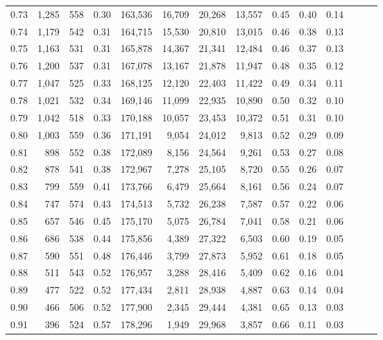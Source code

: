 \begin{tabular}{rrrrrrrrrrrrrr}
0.73 &  1,285 &  558 &  0.30 &  163,536 &   16,709 &  20,268 &  13,557 &  0.45 &  0.40 &      0.14 \\
0.74 &  1,179 &  542 &  0.31 &  164,715 &   15,530 &  20,810 &  13,015 &  0.46 &  0.38 &      0.13 \\
0.75 &  1,163 &  531 &  0.31 &  165,878 &   14,367 &  21,341 &  12,484 &  0.46 &  0.37 &      0.13 \\
0.76 &  1,200 &  537 &  0.31 &  167,078 &   13,167 &  21,878 &  11,947 &  0.48 &  0.35 &      0.12 \\
0.77 &  1,047 &  525 &  0.33 &  168,125 &   12,120 &  22,403 &  11,422 &  0.49 &  0.34 &      0.11 \\
0.78 &  1,021 &  532 &  0.34 &  169,146 &   11,099 &  22,935 &  10,890 &  0.50 &  0.32 &      0.10 \\
0.79 &  1,042 &  518 &  0.33 &  170,188 &   10,057 &  23,453 &  10,372 &  0.51 &  0.31 &      0.10 \\
0.80 &  1,003 &  559 &  0.36 &  171,191 &    9,054 &  24,012 &   9,813 &  0.52 &  0.29 &      0.09 \\
0.81 &    898 &  552 &  0.38 &  172,089 &    8,156 &  24,564 &   9,261 &  0.53 &  0.27 &      0.08 \\
0.82 &    878 &  541 &  0.38 &  172,967 &    7,278 &  25,105 &   8,720 &  0.55 &  0.26 &      0.07 \\
0.83 &    799 &  559 &  0.41 &  173,766 &    6,479 &  25,664 &   8,161 &  0.56 &  0.24 &      0.07 \\
0.84 &    747 &  574 &  0.43 &  174,513 &    5,732 &  26,238 &   7,587 &  0.57 &  0.22 &      0.06 \\
0.85 &    657 &  546 &  0.45 &  175,170 &    5,075 &  26,784 &   7,041 &  0.58 &  0.21 &      0.06 \\
0.86 &    686 &  538 &  0.44 &  175,856 &    4,389 &  27,322 &   6,503 &  0.60 &  0.19 &      0.05 \\
0.87 &    590 &  551 &  0.48 &  176,446 &    3,799 &  27,873 &   5,952 &  0.61 &  0.18 &      0.05 \\
0.88 &    511 &  543 &  0.52 &  176,957 &    3,288 &  28,416 &   5,409 &  0.62 &  0.16 &      0.04 \\
0.89 &    477 &  522 &  0.52 &  177,434 &    2,811 &  28,938 &   4,887 &  0.63 &  0.14 &      0.04 \\
0.90 &    466 &  506 &  0.52 &  177,900 &    2,345 &  29,444 &   4,381 &  0.65 &  0.13 &      0.03 \\
0.91 &    396 &  524 &  0.57 &  178,296 &    1,949 &  29,968 &   3,857 &  0.66 &  0.11 &      0.03 \\

\end{tabular}
